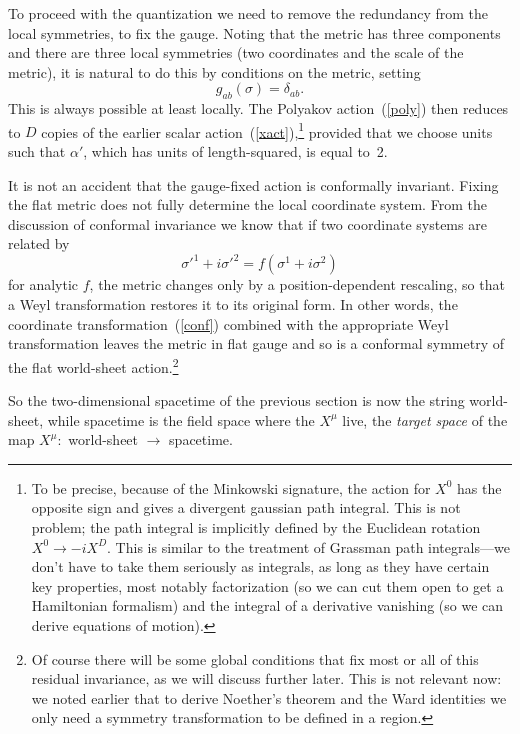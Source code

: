 To proceed with the quantization we need to remove the redundancy
from the local symmetries, to fix the gauge.  Noting that the
metric has three components and there are three local symmetries
(two coordinates and the scale of the metric), it is natural to 
do this by conditions on the metric, setting
\begin{equation}
g_{ab}(\sigma) = \delta_{ab}. \label{flat}
\end{equation}
This is always possible at least locally.
The Polyakov action~(\ref{poly}) then reduces to $D$ copies of
the earlier scalar action~(\ref{xact}),\footnote
{To be precise, because of the Minkowski signature, the action for
$X^0$ has the opposite sign and gives a divergent gaussian path
integral.  This is not problem; the path integral is implicitly
defined by the Euclidean rotation~$X^0 \to -iX^D$.  This is similar
to the treatment of Grassman path integrals---we don't have to take
them seriously as integrals, as long as they have certain key
properties, most notably factorization (so we can cut them open to
get a Hamiltonian formalism) and the integral of a derivative
vanishing (so we can derive equations of motion).} provided that
we choose units such that $\alpha'$, which has units of
length-squared, is equal to~2.

It is not an accident that the gauge-fixed action is conformally
invariant.  Fixing the flat metric does not fully determine the
local coordinate system.  From the discussion of conformal
invariance we know that if two coordinate systems are related by
\begin{equation}
\sigma'^1 + i \sigma'^2 = f(\sigma^1 + i \sigma^2) \label{conf}
\end{equation}
for analytic $f$, the metric changes only by a position-dependent
rescaling, so that a Weyl transformation restores it to its
original form.  In other words, the coordinate
transformation~(\ref{conf}) combined with the appropriate Weyl
transformation leaves the metric in flat gauge and so is a
conformal symmetry of the flat world-sheet action.\footnote
{Of course there will be some global conditions that fix most or all
of this residual invariance, as we will discuss further later.
This is not relevant now:
we noted earlier that to derive
Noether's theorem and the Ward identities we only need a symmetry
transformation to be defined in a region.}

So the two-dimensional spacetime of the
previous section is now the string world-sheet, while
spacetime is the field space where the $X^\mu$ live, the
{\it target space} of the map $X^\mu:$ world-sheet $\to$
spacetime.

